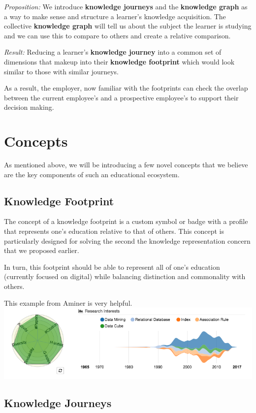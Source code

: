\documentclass[]{book}
\theoremstyle{definition}
\theoremstyle{definition}
\theoremstyle{definition}
\theoremstyle{remark}
\begin{document}
\emph{Proposition:} We introduce \textbf{knowledge journeys} and the
\textbf{knowledge graph} as a way to make sense and structure a
learner's knowledge acquisition. The collective \textbf{knowledge graph}
will tell us about the subject the learner is studying and we can use
this to compare to others and create a relative comparison.

\emph{Result:} Reducing a learner's \textbf{knowledge journey} into a
common set of dimensions that makeup into their \textbf{knowledge
footprint} which would look similar to those with similar journeys.

As a result, the employer, now familiar with the footprints can check
the overlap between the current employee's and a prospective employee's
to support their decision making.

\chapter{Concepts}\label{concepts}

As mentioned above, we will be introducing a few novel concepts that we
believe are the key components of such an educational ecosystem.

\section{Knowledge Footprint}\label{knowledge-footprint}

The concept of a knowledge footprint is a custom symbol or badge with a
profile that represents one's education relative to that of others. This
concept is particularly designed for solving the second the knowledge
representation concern that we proposed earlier.

In turn, this footprint should be able to represent all of one's
education (currently focused on digital) while balancing distinction and
commonality with others.

This example from Aminer is very helpful.
\includegraphics{img/aminer.png}

\section{Knowledge Journeys}\label{knowledge-journeys}
\end{document}

